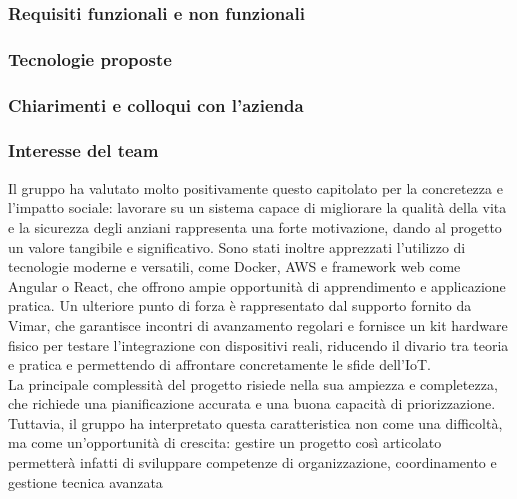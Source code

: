 \documentclass[a4paper,11pt]{article}
\begin{document}
\subsubsection{Requisiti funzionali e non funzionali}
\subsubsection{Tecnologie proposte}
\subsubsection{Chiarimenti e colloqui con l'azienda}
\subsubsection{Interesse del team}
\parbox[t]{\linewidth}{%
Il gruppo ha valutato molto positivamente questo capitolato per la concretezza e
l'impatto sociale: lavorare su un sistema capace di migliorare la qualità della vita e
la sicurezza degli anziani rappresenta una forte motivazione, dando al progetto un
valore tangibile e significativo. Sono stati inoltre apprezzati l'utilizzo di tecnologie
moderne e versatili, come Docker, AWS e framework web come Angular o React,
che offrono ampie opportunità di apprendimento e applicazione pratica. Un
ulteriore punto di forza è rappresentato dal supporto fornito da Vimar, che
garantisce incontri di avanzamento regolari e fornisce un kit hardware fisico per
testare l'integrazione con dispositivi reali, riducendo il divario tra teoria e pratica e
permettendo di affrontare concretamente le sfide dell'IoT.
\\
La principale complessità del progetto risiede nella sua ampiezza e completezza,
che richiede una pianificazione accurata e una buona capacità di priorizzazione.
Tuttavia, il gruppo ha interpretato questa caratteristica non come una difficoltà, ma
come un'opportunità di crescita: gestire un progetto così articolato permetterà
infatti di sviluppare competenze di organizzazione, coordinamento e gestione
tecnica avanzata
}
\end{document}
